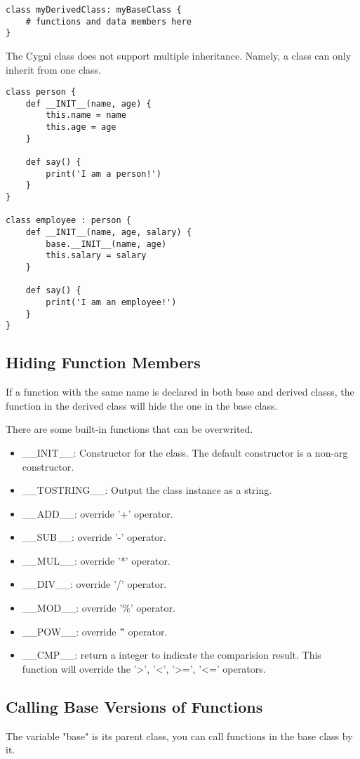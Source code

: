 \begin{lstlisting}
class myDerivedClass: myBaseClass {
	# functions and data members here
}
\end{lstlisting} 

The Cygni class does not support multiple inheritance. Namely, a class can only inherit from one class.

\begin{lstlisting}
class person {
	def __INIT__(name, age) {
		this.name = name
		this.age = age
	}

	def say() {
		print('I am a person!')
	}
}

class employee : person {
	def __INIT__(name, age, salary) {
		base.__INIT__(name, age)
		this.salary = salary
	}

	def say() {
		print('I am an employee!')
	}
}
\end{lstlisting}


\subsection{Hiding Function Members}
If a function with the same name is declared in both base and derived classs, the function in the derived class will hide the one in the base class.

There are some built-in functions that can be overwrited.
\begin{itemize}
	\item \_\_INIT\_\_: Constructor for the class. The default constructor is a non-arg constructor.
	\item \_\_TOSTRING\_\_: Output the class instance as a string.
	\item \_\_ADD\_\_: override '+' operator.
	\item \_\_SUB\_\_: override '-' operator.
	\item \_\_MUL\_\_: override '*' operator.
	\item \_\_DIV\_\_: override '/' operator.
	\item \_\_MOD\_\_: override '\%' operator.
	\item \_\_POW\_\_: override '\^' operator.
	\item \_\_CMP\_\_: return a integer to indicate the comparision result. This function will override the '>', '<', '>=', '<=' operators.
\end{itemize}


\subsection{Calling Base Versions of Functions}
The variable "base" is its parent class, you can call functions in the base class by it. 
